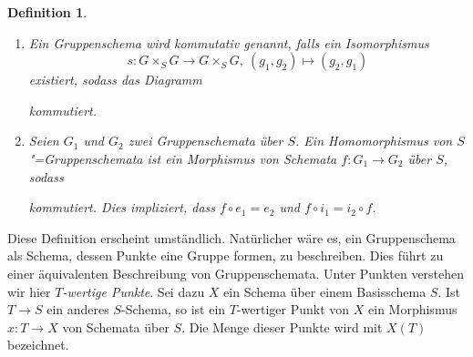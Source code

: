 \documentclass[DIV11,11pt]{scrartcl}
\theoremstyle{Definitionen}
\newtheorem{Def}{Definition}[section]
\theoremstyle{Aussagen}
\DeclareMathOperator{\id}{id}
\begin{document}
\begin{Def}
\begin{enumerate}
und
\begin{center},\end{center}
wobei $\Delta_{G/S}\colon G\rightarrow G\times_S G$ der Diagonalmorphismus ist.
\item Ein Gruppenschema wird \textit{kommutativ} genannt, falls ein Isomorphismus
\begin{displaymath}
s\colon G\times_S G\rightarrow G\times_S G,~(g_1,g_2)\mapsto(g_2,g_1)
\end{displaymath}
existiert, sodass das Diagramm
\begin{center}\end{center}
kommutiert.
\item Seien $G_1$ und $G_2$ zwei Gruppenschemata über $S$. Ein \textit{Homomorphismus von $S$"=Gruppenschemata} ist ein Morphismus von Schemata $f\colon G_1\rightarrow G_2$ über $S$, sodass
\begin{center}\end{center}
kommutiert. Dies impliziert, dass $f\circ e_1=e_2$ und $f\circ i_1=i_2\circ f$.
\end{enumerate}
\end{Def}

Diese Definition erscheint umständlich. Natürlicher wäre es, ein Gruppenschema als Schema, dessen Punkte eine Gruppe formen, zu beschreiben. Dies führt zu einer äquivalenten Beschreibung von Gruppenschemata. Unter Punkten verstehen wir hier \textit{$T$-wertige Punkte}. Sei dazu $X$ ein Schema über einem Basisschema $S$. Ist $T\rightarrow S$ ein anderes $S$-Schema, so ist ein $T$-wertiger Punkt von $X$ ein Morphismus $x\colon T\rightarrow X$ von Schemata über $S$. Die Menge dieser Punkte wird mit $X(T)$ bezeichnet. 
\end{document}
